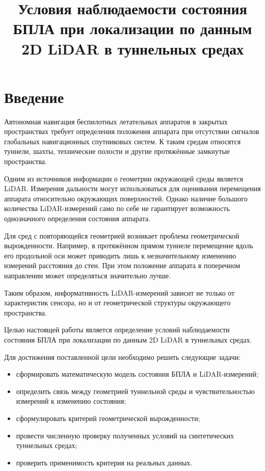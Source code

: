 \documentclass{misisarticle}
\title{Условия наблюдаемости состояния БПЛА при локализации
по данным 2D LiDAR в туннельных средах}
\begin{document}
\maketitle

\section{Введение}

Автономная навигация беспилотных летательных аппаратов
в закрытых пространствах требует определения положения аппарата
при отсутствии сигналов глобальных навигационных спутниковых
систем. К таким средам относятся туннели, шахты, технические
полости и другие протяжённые замкнутые пространства.

Одним из источников информации о геометрии окружающей среды
является LiDAR. Измерения дальности могут использоваться для
оценивания перемещения аппарата относительно окружающих
поверхностей. Однако наличие большого количества LiDAR-измерений
само по себе не гарантирует возможность однозначного определения
состояния аппарата.

Для сред с повторяющейся геометрией возникает проблема
геометрической вырожденности. Например, в протяжённом прямом
туннеле перемещение вдоль его продольной оси может приводить
лишь к незначительному изменению измерений расстояния до стен.
При этом положение аппарата в поперечном направлении может
определяться значительно лучше.

Таким образом, информативность LiDAR-измерений зависит не только
от характеристик сенсора, но и от геометрической структуры
окружающего пространства.

Целью настоящей работы является определение условий
наблюдаемости состояния БПЛА при локализации по данным 2D LiDAR
в туннельных средах.

Для достижения поставленной цели необходимо решить следующие задачи:
\begin{itemize}
    \item сформировать математическую модель состояния БПЛА
    и LiDAR-измерений;
    \item определить связь между геометрией туннельной среды
    и чувствительностью измерений к изменению состояния;
    \item сформулировать критерий геометрической вырожденности;
    \item провести численную проверку полученных условий
    на синтетических туннельных средах;
    \item проверить применимость критерия на реальных данных.
\end{itemize}
\end{document}
